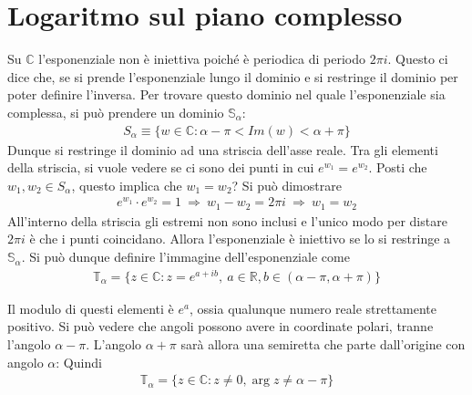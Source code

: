 \documentclass[a4paper, oneside]{article}
\begin{document}
\section{Logaritmo sul piano complesso}
Su $\mathbb{C}$ l'esponenziale non è iniettiva poiché è periodica
di periodo $2\pi i$. Questo ci dice che, se si prende l'esponenziale lungo 
il dominio e si restringe il dominio per poter definire l'inversa. Per trovare 
questo dominio nel quale l'esponenziale sia complessa, si può prendere
un dominio $\mathbb{S_\alpha}$:
\begin{gather*}
    S_\alpha \equiv \{w \in \mathbb{C} : \alpha - \pi <  Im(w) < \alpha + \pi\}
\end{gather*}
Dunque si restringe il dominio ad una striscia dell'asse reale. Tra gli elementi della striscia,
si vuole vedere se ci sono dei punti in cui $e^{w_1} = e^{w_2}$. Posti che 
$w_1, w_2  \in S_\alpha$, questo implica che $w_1 = w_2$? Si può dimostrare
\begin{gather*}
    e^{w_1} \cdot e^{w_2} = 1 \ \Longrightarrow \ w_1 - w_2 = 2\pi i \ \Longrightarrow \ w_1 = w_2
\end{gather*}
All'interno della striscia gli estremi non sono inclusi e l'unico modo per distare
$2\pi i$ è che i punti coincidano. Allora l'esponenziale è iniettivo se lo si restringe 
a $\mathbb{S}_\alpha$. Si può dunque definire l'immagine dell'esponenziale come
\begin{align}
    \mathbb{T}_\alpha = \{z \in \mathbb{C} : z = e^{a + ib}, \ a \in \mathbb{R}, b \in (\alpha - \pi, \alpha + \pi)\}
\end{align}
\begin{figure}
    \centering
    \caption{}
\end{figure}
Il modulo di questi elementi è $e^{a}$, ossia qualunque numero reale strettamente positivo. Si può vedere che 
angoli possono avere in coordinate polari, tranne l'angolo $\alpha - \pi$. L'angolo $\alpha + \pi$ sarà allora 
una semiretta che parte dall'origine con angolo $\alpha$:
Quindi 
\begin{gather*}
    \mathbb{T}_\alpha = \{z \in \mathbb{C} : z \neq 0, \arg z \neq \alpha - \pi \}
\end{gather*}
\end{document}
